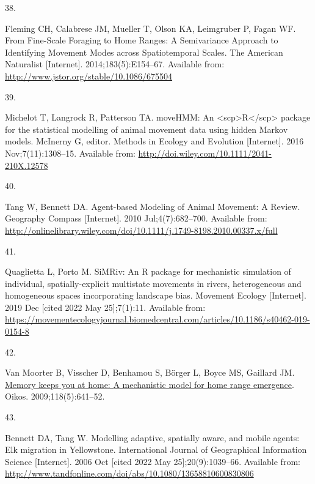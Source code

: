 \documentclass[10pt,a4paper]{article}
\newlength{\cslhangindent}
\newlength{\csllabelwidth}
\newlength{\cslentryspacingunit} %
\newenvironment{CSLReferences}[2] %
 {%
  \setlength{\parindent}{0pt}
  \ifodd #1
  \let\oldpar\par
  \def\par{\hangindent=\cslhangindent\oldpar}
  \fi
  \setlength{\parskip}{#2\cslentryspacingunit}
 }%
 {}
\newcommand{\CSLLeftMargin}[1]{\parbox[t]{\csllabelwidth}{#1}}
\newcommand{\CSLRightInline}[1]{\parbox[t]{\linewidth - \csllabelwidth}{#1}\break}
\begin{document}
\begin{CSLReferences}{0}{0}
\leavevmode{}%
\CSLLeftMargin{38. }
\CSLRightInline{Fleming CH, Calabrese JM, Mueller T, Olson KA, Leimgruber P, Fagan WF. From {Fine}-{Scale} {Foraging} to {Home} {Ranges}: {A} {Semivariance} {Approach} to {Identifying} {Movement} {Modes} across {Spatiotemporal} {Scales}. The American Naturalist {[}Internet{]}. 2014;183(5):E154--67. Available from: \url{http://www.jstor.org/stable/10.1086/675504}}

\leavevmode{}%
\CSLLeftMargin{39. }
\CSLRightInline{Michelot T, Langrock R, Patterson TA. {moveHMM}: An {\textless{}}scp{\textgreater{}}{R}{\textless{}}/scp{\textgreater{}} package for the statistical modelling of animal movement data using hidden {Markov} models. McInerny G, editor. Methods in Ecology and Evolution {[}Internet{]}. 2016 Nov;7(11):1308--15. Available from: \url{http://doi.wiley.com/10.1111/2041-210X.12578}}

\leavevmode{}%
\CSLLeftMargin{40. }
\CSLRightInline{Tang W, Bennett DA. Agent-based {Modeling} of {Animal} {Movement}: {A} {Review}. Geography Compass {[}Internet{]}. 2010 Jul;4(7):682--700. Available from: \url{http://onlinelibrary.wiley.com/doi/10.1111/j.1749-8198.2010.00337.x/full}}

\leavevmode{}%
\CSLLeftMargin{41. }
\CSLRightInline{Quaglietta L, Porto M. {SiMRiv}: An {R} package for mechanistic simulation of individual, spatially-explicit multistate movements in rivers, heterogeneous and homogeneous spaces incorporating landscape bias. Movement Ecology {[}Internet{]}. 2019 Dec {[}cited 2022 May 25{]};7(1):11. Available from: \url{https://movementecologyjournal.biomedcentral.com/articles/10.1186/s40462-019-0154-8}}

\leavevmode{}%
\CSLLeftMargin{42. }
\CSLRightInline{Van Moorter B, Visscher D, Benhamou S, Börger L, Boyce MS, Gaillard JM. \href{https://doi.org/10.1111/j.1600-0706.2008.17003.x}{Memory keeps you at home: {A} mechanistic model for home range emergence}. Oikos. 2009;118(5):641--52. }

\leavevmode{}%
\CSLLeftMargin{43. }
\CSLRightInline{Bennett DA, Tang W. Modelling adaptive, spatially aware, and mobile agents: {Elk} migration in {Yellowstone}. International Journal of Geographical Information Science {[}Internet{]}. 2006 Oct {[}cited 2022 May 25{]};20(9):1039--66. Available from: \url{http://www.tandfonline.com/doi/abs/10.1080/13658810600830806}}


\end{CSLReferences}
\end{document}
